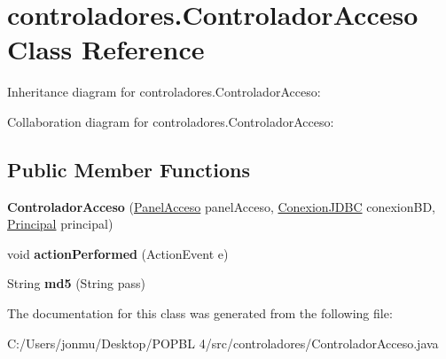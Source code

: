 \hypertarget{classcontroladores_1_1_controlador_acceso}{}\section{controladores.\+Controlador\+Acceso Class Reference}
\label{classcontroladores_1_1_controlador_acceso}


Inheritance diagram for controladores.\+Controlador\+Acceso\+:


Collaboration diagram for controladores.\+Controlador\+Acceso\+:
\subsection*{Public Member Functions}
\begin{DoxyCompactItemize}
\item 
\mbox{\label{classcontroladores_1_1_controlador_acceso_ac9e7e1075d18fe14a6eb23ebcfb7b169}} 
{\bfseries Controlador\+Acceso} (\mbox{\hyperlink{classpaneles_1_1_panel_acceso}{Panel\+Acceso}} panel\+Acceso, \mbox{\hyperlink{classmysql_1_1_conexion_j_d_b_c}{Conexion\+J\+D\+BC}} conexion\+BD, \mbox{\hyperlink{classvistas_1_1_principal}{Principal}} principal)
\item 
\mbox{\label{classcontroladores_1_1_controlador_acceso_ab61e9c919427421412501af1772a005a}} 
void {\bfseries action\+Performed} (Action\+Event e)
\item 
\mbox{\label{classcontroladores_1_1_controlador_acceso_a935597b08e48ed6c762ee91ad7e0f5ea}} 
String {\bfseries md5} (String pass)
\end{DoxyCompactItemize}


The documentation for this class was generated from the following file\+:\begin{DoxyCompactItemize}
\item 
C\+:/\+Users/jonmu/\+Desktop/\+P\+O\+P\+B\+L 4/src/controladores/Controlador\+Acceso.\+java\end{DoxyCompactItemize}
